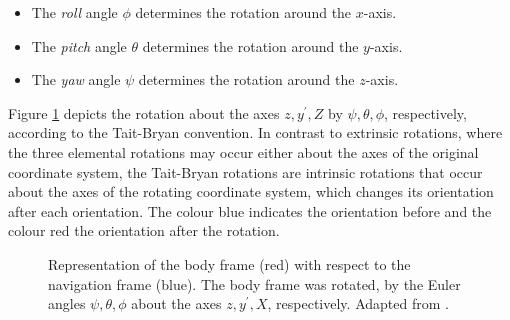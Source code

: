 \begin{itemize}
\item The \emph{roll} angle $\phi$ determines the rotation around the $x$-axis.
\item The \emph{pitch} angle $\theta$ determines the rotation around the $y$-axis.
\item The \emph{yaw} angle $\psi$ determines the rotation around the $z$-axis.
\end{itemize}

\noindent
Figure \ref{fig:Euler_angles} depicts the rotation about the axes $z, y^{'}, Z$ by $\psi, \theta, \phi$, respectively, according to the Tait-Bryan convention. In contrast to extrinsic rotations, where the three elemental rotations may occur either about the axes of the original coordinate system, the Tait-Bryan rotations are intrinsic rotations that occur about the axes of the rotating coordinate system, which changes its orientation after each orientation. The colour blue indicates the orientation before and the colour red the orientation after the rotation.

\begin{figure}[ht]
\centering
{}
\caption{Representation of the body frame (red) with respect to the navigation frame (blue). The body frame was rotated, by the Euler angles $\psi, \theta, \phi$ about the axes $z, y^{'}, X$, respectively. Adapted from \cite{Wiki_taitbryan}.} \label{fig:Euler_angles}
\end{figure}

